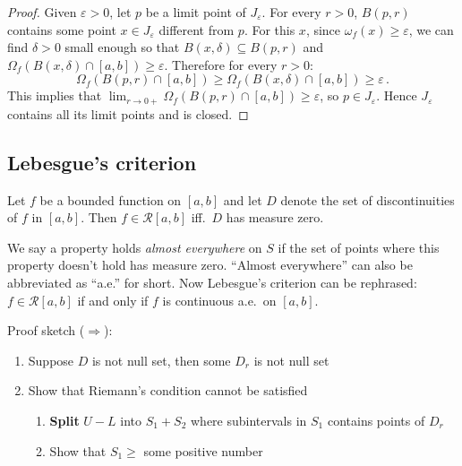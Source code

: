 \documentclass{article}
\newcommand{\Riemann}{\mathcal R}
\begin{document}
\begin{proof}
    Given $ \varepsilon > 0 $, let $ p $ be a limit point of $ J_\varepsilon $. For every $ r > 0 $, $ B(p, r) $ contains some point $ x \in J_\varepsilon $ different from $ p $. For this $ x $, since $ \omega_f (x) \geqslant \varepsilon $, we can find $ \delta > 0 $ small enough so that $ B(x, \delta) \subseteq B(p, r) $ and $ \Omega_f (B(x, \delta) \cap [a, b]) \geqslant \varepsilon $. Therefore for every $ r > 0 $:
    \[ 
        \Omega_f (B(p, r) \cap [a, b]) \geqslant \Omega_f (B(x, \delta) \cap [a, b]) \geqslant \varepsilon \,.
    \]
    This implies that $ \lim_{r\to 0+} \Omega_f (B(p, r) \cap [a, b]) \geqslant \varepsilon $, so $ p \in J_\varepsilon $. Hence $ J_\varepsilon $ contains all its limit points and is closed.
\end{proof}

\subsection{Lebesgue's criterion}
\begin{theorem}
    Let $ f $ be a bounded function on $ [a, b] $ and let $ D $ denote the set of discontinuities of $ f $ in $ [a, b] $. Then $ f \in \Riemann[a, b] $ iff.\ $ D $ has measure zero.
\end{theorem}

We say a property holds \textit{almost everywhere} on $ S $ if the set of points where this property doesn't hold has measure zero. ``Almost everywhere'' can also be abbreviated as ``a.e.'' for short. Now Lebesgue's criterion can be rephrased: $ f \in \Riemann[a, b] $ if and only if $ f $ is continuous a.e.\ on $ [a, b] $.

Proof sketch ($ \Rightarrow $):
\begin{enumerate}
    \item Suppose $ D $ is not null set, then some $ D_r $ is not null set
    \item Show that Riemann's condition cannot be satisfied
    \begin{enumerate}
        \item \textbf{Split} $ U - L $ into $ S_1 + S_2 $ where subintervals in $ S_1 $ contains points of $ D_r $
        \item Show that $ S_1 \geqslant $ some positive number
    \end{enumerate}
\end{enumerate}
\end{document}
